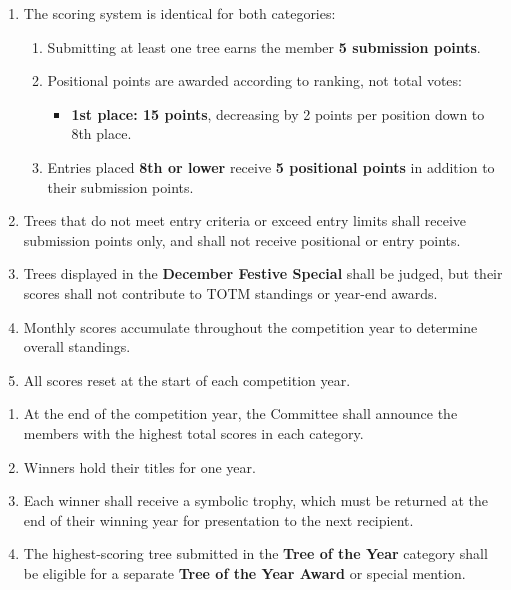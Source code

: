 \setcounter{TOTMsection}{5} %
\begin{enumerate}
    \item The scoring system is identical for both categories:
        \begin{enumerate}
            \item Submitting at least one tree earns the member \textbf{5 submission points}.
            \item Positional points are awarded according to ranking, not total votes:
                \begin{itemize}
                    \item \textbf{1st place: 15 points}, decreasing by 2 points per position down to 8th place.
                \end{itemize}
            \item Entries placed \textbf{8th or lower} receive \textbf{5 positional points} in addition to their submission points.
        \end{enumerate}
    \item Trees that do not meet entry criteria or exceed entry limits shall receive submission points only, and shall not receive positional or entry points.
    \item Trees displayed in the \textbf{December Festive Special} shall be judged, but their scores shall not contribute to TOTM standings or year-end awards.
    \item Monthly scores accumulate throughout the competition year to determine overall standings.
    \item All scores reset at the start of each competition year.
\end{enumerate}

\setcounter{TOTMsection}{6} %
\begin{enumerate}
    \item At the end of the competition year, the Committee shall announce the members with the highest total scores in each category.
    \item Winners hold their titles for one year.
    \item Each winner shall receive a symbolic trophy, which must be returned at the end of their winning year for presentation to the next recipient.
    \item The highest-scoring tree submitted in the \textbf{Tree of the Year} category shall be eligible for a separate \textbf{Tree of the Year Award} or special mention.
\end{enumerate}

